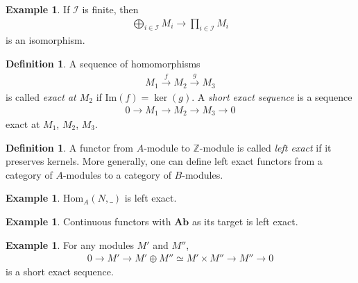 \documentclass[12pt]{report}
\theoremstyle{plain}
\theoremstyle{remark}
\theoremstyle{definition}
\newtheorem{definition}[theorem]{Definition}
\newtheorem{example}[theorem]{Example}
\newcommand{\Z}{\mathbb{Z}}
\newcommand{\Hom}[3]{\mathrm{Hom}_{#3}(#1,#2)}
\begin{document}
\begin{example}
    If $\mathcal{I}$ is finite, then
    \begin{align*}
        \bigoplus_{i\in\mathcal{I}}M_i\rightarrow \prod_{i\in \mathcal{I}} M_i
    \end{align*}
    is an isomorphism.
\end{example}

\begin{definition}
    A sequence of homomorphisms
    \begin{align*}
        M_1\xrightarrow{f}M_2\xrightarrow{g}M_3
    \end{align*}
    is called \emph{exact at $M_2$} if $\mathrm{Im}(f) = \ker(g)$. A \emph{short exact sequence} is a sequence
    \begin{align*}
        0\rightarrow M_1 \rightarrow M_2\rightarrow M_3 \rightarrow 0
    \end{align*}
    exact at $M_1$, $M_2$, $M_3$.
\end{definition}

\begin{definition}
    A functor from $A$-module to $\Z$-module is called \emph{left exact} if it preserves kernels. More generally, one can define left exact functors from a category of $A$-modules to a category of $B$-modules.
\end{definition}

\begin{example}
    $\Hom{N}{\_}{A}$ is left exact.
\end{example}

\begin{example}
    Continuous functors with $\mathbf{Ab}$ as its target is left exact.
\end{example}

\begin{example}
    For any modules $M'$ and $M''$,
    \begin{align*}
        0\rightarrow M' \rightarrow M'\oplus M''\simeq M'\times M'' \rightarrow M''\rightarrow 0
    \end{align*}
    is a short exact sequence.
\end{example}
\end{document}
